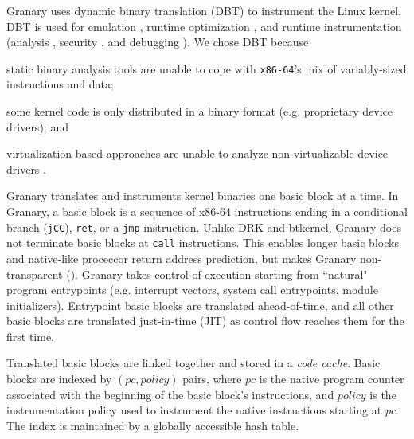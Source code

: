\documentclass[preprint]{sigplanconf}
\begin{document}
Granary uses dynamic binary translation (DBT) to instrument the Linux kernel. DBT is used for emulation \cite{QEMU}, runtime optimization \cite{DynamoRIOOptimization}, and runtime instrumentation (analysis \cite{DynamoRIO, DRK, btkernel, ProfilingSimics}, security \cite{Vx32,NaCl,ProgramShepherding}, and debugging \cite{Valgrind}). We chose DBT because \begin{inparaenum}[i)]
	\item static binary analysis tools are unable to cope with \texttt{x86-64}'s mix of variably-sized instructions and data; 
	\item some kernel code is only distributed in a binary format (e.g. proprietary device drivers); and
	\item virtualization-based approaches are unable to analyze non-virtualizable device drivers \cite{DRK}.
\end{inparaenum}

Granary translates and instruments kernel binaries one basic block at a time. In Granary, a basic block is a sequence of x86-64 instructions ending in a conditional branch (\texttt{jCC}), \texttt{ret}, or a \texttt{jmp} instruction. Unlike DRK and btkernel, Granary does not terminate basic blocks at \texttt{call} instructions. This enables longer basic blocks and native-like proceccor return address prediction, but makes Granary non-transparent (). Granary takes control of execution starting from ``natural" program entrypoints (e.g. interrupt vectors, system call entrypoints, module initializers). Entrypoint basic blocks  are translated ahead-of-time, and all other basic blocks are translated just-in-time (JIT) as control flow reaches them for the first time.

Translated basic blocks are linked together and stored in a \emph{code cache}. Basic blocks are indexed by $(pc, policy)$ pairs, where $pc$ is the native program counter associated with the beginning of the basic block's instructions, and $policy$ is the instrumentation policy used to instrument the native instructions starting at $pc$. The index is maintained by a globally accessible hash table.
\end{document}

